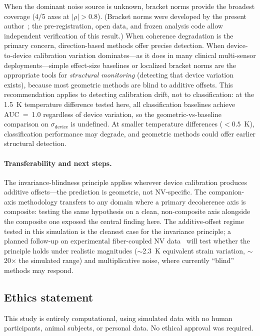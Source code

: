 \documentclass[11pt]{article}
\begin{document}
When the dominant noise source is unknown, bracket norms provide the
broadest coverage (4/5 axes at $|\rho| > 0.8$).  (Bracket norms were
developed by the present author~\citep{tower2026bracket}; the
pre-registration, open data, and frozen analysis code allow independent
verification of this result.)  When coherence
degradation is the primary concern, direction-based methods offer
precise detection.  When device-to-device calibration variation
dominates---as it does in many clinical multi-sensor
deployments---simple effect-size baselines or localized bracket norms
are the appropriate tools for \emph{structural monitoring} (detecting
that device variation exists), because most geometric methods are blind
to additive offsets.  This recommendation applies to detecting
calibration drift, not to classification: at the 1.5~K temperature
difference tested here, all classification baselines achieve AUC~=~1.0
regardless of device variation, so the geometric-vs-baseline comparison
on $\sigma_\text{device}$ is undefined.  At smaller temperature
differences ($< 0.5$~K), classification performance may degrade, and
geometric methods could offer earlier structural detection.

\paragraph{Transferability and next steps.}
The invariance-blindness principle applies wherever device calibration
produces additive offsets---the prediction is
geometric, not NV-specific.  The companion-axis methodology transfers
to any domain where a primary decoherence axis is composite: testing
the same hypothesis on a clean, non-composite axis alongside the
composite one exposed the central finding here.  The additive-offset
regime tested in this simulation is the cleanest case for the
invariance principle; a planned follow-up on experimental fiber-coupled
NV data~\citep{rajpal2025evaluating} will test whether the principle
holds under realistic magnitudes ($\sim$2.3~K equivalent strain
variation, $\sim$20$\times$ the simulated range) and multiplicative
noise, where currently ``blind'' methods may respond.

\subsection*{Ethics statement}

This study is entirely computational, using simulated data with no
human participants, animal subjects, or personal data.  No ethical
approval was required.
\end{document}

